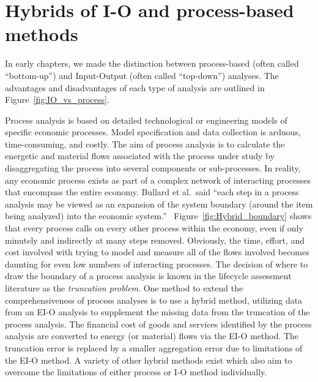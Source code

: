 \section{Hybrids of I-O and process-based methods}
\label{sec:hybrid}

In early chapters,
we made the distinction between
process-based (often called ``bottom-up'') 
and Input-Output (often called ``top-down'')
analyses.
The advantages and disadvantages of each type
of analysis are outlined in Figure~\ref{fig:IO_vs_process}.

Process analysis is based on detailed technological
or engineering models of specific economic processes.
Model specification and data collection is arduous,
time-consuming,
and costly.
The aim of process analysis is to calculate the
energetic and material flows associated with the process
under study by disaggregating the process into
several components or sub-processes.
In reality,
any economic process exists as part of a complex network of
interacting processes that encompass the entire economy.
Bullard et al.\ said 
``each step in a process analysis may be viewed as 
an expansion of the system boundary 
(around the item being analyzed) 
into the economic system.''~\cite[p.~281]{Bullard:1978vd}
Figure~\ref{fig:Hybrid_boundary} shows that 
every process calls on every other process within the economy,
even if only minutely and indirectly at many steps removed.
Obviously,
the time, 
effort,
and cost involved with trying to model and
measure all of the flows involved becomes daunting
for even low numbers of interacting processes.
The decision of where to draw the boundary of
a process analysis is known in the 
lifecycle assessment literature as the 
\emph{truncation problem}.\cite{Suh2004}
One method to extend the comprehensiveness of process
analyses is to use a hybrid method,
utilizing data from an EI-O analysis to supplement the
missing data from the truncation of the process analysis.
The financial cost of goods and services identified by
the process analysis are converted to energy
(or material) flows via the EI-O method.
The truncation error is replaced by a smaller aggregation
error due to limitations of the EI-O 
method.\cite{Bullard:1978vd}
A variety of other hybrid methods exist which also aim to
overcome the limitations of either process or I-O method 
individually.\cite{Bullard:1978vd, Suh2004, Suh2002, 
Crawford2008, Zhai2010}

